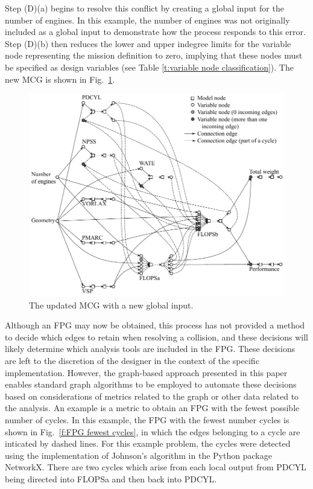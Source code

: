 Step (D)(a) begins to resolve this conflict by creating a global input for the number of engines. In this example, the number of engines was not originally included as a global input to demonstrate how the process responds to this error.
Step (D)(b) then reduces the lower and upper indegree limits for the variable node representing the mission definition to zero, implying that these nodes must be specified as design variables (see Table \ref{t:variable node classification}). The new MCG is shown in Fig.~\ref{f:MCG}.
	\begin{figure}[htb!]
	  \begin{center}
		\includegraphics[width=4.5in]{images/MCG_edit}
	  \end{center}
	  \caption{The updated MCG with a new global input.}
	\label{f:MCG}
	\end{figure}

	Although an FPG may now be obtained, this process has not provided a method to decide which edges to retain when resolving a collision, and these decisions will likely determine which analysis tools are included in the FPG. These decisions are left to the discretion of the designer in the context of the specific implementation. 
	However, the graph-based approach presented in this paper enables standard graph algorithms to be employed to automate these decisions based on considerations of metrics related to the graph or other data related to the analysis. 
	An example is a metric to obtain an FPG with the fewest possible number of cycles. 
In this example, the FPG with the fewest number cycles is shown in Fig.~\ref{f:FPG fewest cycles}, in which the edges belonging to a cycle are inticated by dashed lines. 
For this example problem, the cycles were detected using the implementation of Johnson's algorithm \cite{Johnson1975} in the Python package NetworkX. 
There are two cycles which arise from each local output from PDCYL being directed into FLOPSa and then back into PDCYL. 

